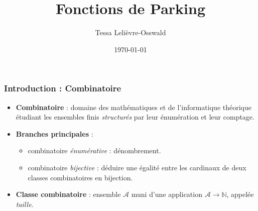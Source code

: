 \documentclass{beamer}
\title{Fonctions de Parking}
\author{Tessa Lelièvre-Osswald}
\institute{Encadrant : Matthieu Josuat-Vergès \\ IRIF - Pôle Combinatoire}
\date{\today}
\begin{document}
\frame{\titlepage} %

\begin{frame} %
    \frametitle{Introduction : Combinatoire}
    \begin{itemize}
        \item \textbf{Combinatoire} : domaine des mathématiques et de 
        l'informatique théorique étudiant les ensembles finis
        \emph{structurés} par leur énumération et leur comptage.
        \item \textbf{Branches principales} :
        \begin{itemize}
            \item combinatoire \emph{énumérative} : dénombrement.
            \item combinatoire \emph{bijective} : déduire une égalité
            entre les cardinaux de deux classes combinatoires  en bijection.
        \end{itemize}

        \item \textbf{Classe combinatoire} : ensemble $\mathcal{A}$ muni
        d'une application $\mathcal{A} \to \mathbb{N}$, appelée \emph{taille}. 
    \end{itemize}
\end{frame}
\end{document}
